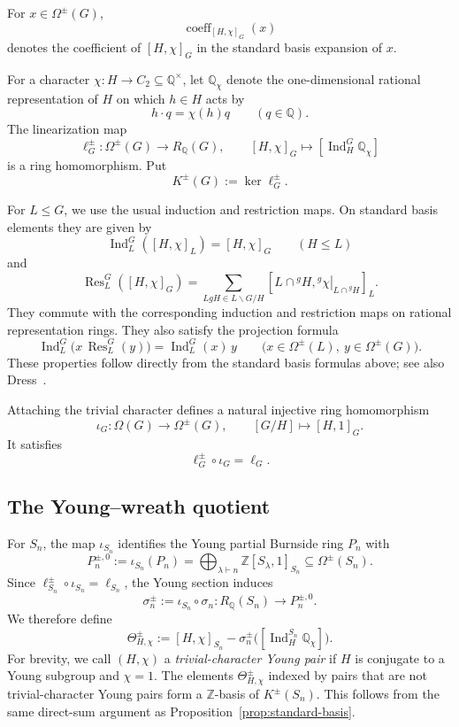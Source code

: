 \documentclass[a4paper,11pt]{article}
\numberwithin{equation}{section}
\newcommand{\Q}{\mathbb{Q}}
\newcommand{\Z}{\mathbb{Z}}
\newcommand{\Ind}{\operatorname{Ind}}
\newcommand{\Res}{\operatorname{Res}}
\newcommand{\coeff}{\operatorname{coeff}}
\begin{document}
For $x\in\Omega^{\pm}(G)$,
\[
  \coeff_{[H,\chi]_G}(x)
\]
denotes the coefficient of $[H,\chi]_G$ in the standard basis expansion of
$x$.

For a character $\chi:H\to C_2\subseteq\Q^\times$, let $\Q_\chi$ denote the
one-dimensional rational representation of $H$ on which $h\in H$ acts by
\[
  h\cdot q=\chi(h)q
  \qquad(q\in\Q).
\]
The linearization map
\[
  \ell_G^{\pm}:\Omega^{\pm}(G)\longrightarrow R_{\Q}(G),
  \qquad
  [H,\chi]_G\longmapsto[\Ind_H^G\Q_\chi]
\]
is a ring homomorphism. Put
\[
  K^{\pm}(G):=\ker\ell_G^{\pm}.
\]

For $L\le G$, we use the usual induction and restriction maps. On standard
basis elements they are given by
\[
  \Ind_L^G([H,\chi]_L)=[H,\chi]_G
  \qquad(H\le L)
\]
and
\[
  \Res_L^G([H,\chi]_G)
  =
  \sum_{LgH\in L\backslash G/H}
  \left[
    L\cap{}^gH,
    \left.{}^g\chi\right|_{L\cap{}^gH}
  \right]_L.
\]
They commute with the corresponding induction and restriction maps on
rational representation rings. They also satisfy the projection formula
\begin{equation}\label{eq:monomial-projection-formula}
  \Ind_L^G\bigl(x\,\Res_L^G(y)\bigr)
  =
  \Ind_L^G(x)\,y
  \qquad
  \bigl(x\in\Omega^{\pm}(L),\ y\in\Omega^{\pm}(G)\bigr).
\end{equation}
These properties follow directly from the standard basis formulas above; see
also Dress~\cite{DressMonomial}.

Attaching the trivial character defines a natural injective ring homomorphism
\[
  \iota_G:\Omega(G)\longrightarrow\Omega^{\pm}(G),
  \qquad
  [G/H]\longmapsto[H,1]_G.
\]
It satisfies
\[
  \ell_G^{\pm}\circ\iota_G=\ell_G.
\]

\subsection{The Young--wreath quotient}

For $S_n$, the map $\iota_{S_n}$ identifies the Young partial Burnside ring
$P_n$ with
\[
  P_n^{\pm,0}
  :=
  \iota_{S_n}(P_n)
  =
  \bigoplus_{\lambda\vdash n}
  \Z[S_\lambda,1]_{S_n}
  \subseteq\Omega^{\pm}(S_n).
\]
Since $\ell_{S_n}^{\pm}\circ\iota_{S_n}=\ell_{S_n}$, the Young section induces
\[
  \sigma_n^{\pm}
  :=
  \iota_{S_n}\circ\sigma_n:
  R_{\Q}(S_n)\longrightarrow P_n^{\pm,0}.
\]
We therefore define
\[
  \Theta_{H,\chi}^{\pm}
  :=
  [H,\chi]_{S_n}
  -
  \sigma_n^{\pm}\bigl([\Ind_H^{S_n}\Q_\chi]\bigr).
\]
For brevity, we call $(H,\chi)$ a \emph{trivial-character Young pair} if
$H$ is conjugate to a Young subgroup and $\chi=1$. The elements
$\Theta_{H,\chi}^{\pm}$ indexed by pairs that are not trivial-character Young
pairs form a $\Z$-basis of $K^{\pm}(S_n)$. This follows from the same
direct-sum argument as Proposition~\ref{prop:standard-basis}.
\end{document}
